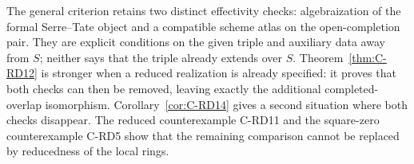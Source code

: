 \begin{remark}\label{auto:C:cfff6b2c31f1}

The general criterion retains two distinct effectivity checks:
algebraization of the formal Serre--Tate object and a compatible
scheme atlas on the open-completion pair. They are explicit
conditions on the given triple and auxiliary data away from $S$;
neither says that the triple already extends over $S$.
Theorem~\ref{thm:C-RD12} is stronger when a reduced realization is
already specified: it proves that both checks can then be removed,
leaving exactly the additional completed-overlap isomorphism.
Corollary~\ref{cor:C-RD14} gives a second situation where both checks
disappear. The reduced counterexample C-RD11 and the square-zero
counterexample C-RD5 show that the remaining comparison cannot be
replaced by reducedness of the local rings.
\end{remark}

